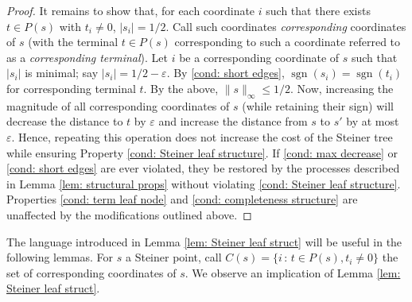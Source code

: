 \documentclass{article}\providecommand{\DeclareRedundantLanguages}[2]{}\usepackage[a4paper,margin=20mm]{geometry}
\DeclareMathOperator{\sgn}{sgn}
\newcommand{\1}{\textbf{1}}
\begin{document}
\begin{proof}
It remains to show that, for each coordinate $i$ such that there exists $t \in P(s)$ with $t_i \neq 0$, $|s_i| = 1/2$. Call such coordinates \textit{corresponding} coordinates of $s$ (with the terminal $t \in P(s)$ corresponding to such a coordinate referred to as a \textit{corresponding terminal}). Let $i$ be a corresponding coordinate of $s$ such that $|s_i|$ is minimal; say $|s_i| = 1/2 - \varepsilon$. By \ref{cond: short edges}, $\sgn(s_i) = \sgn(t_i)$ for corresponding terminal $t.$ By the above, $\|s\|_{\infty} \leq 1/2$. Now, increasing the magnitude of all corresponding coordinates of $s$ (while retaining their sign) will decrease the distance to $t$ by $\varepsilon$ and increase the distance from $s$ to $s'$ by at most $\varepsilon$. Hence, repeating this operation does not increase the cost of the Steiner tree while ensuring Property \ref{cond: Steiner leaf structure}.  If \ref{cond: max decrease} or \ref{cond: short edges} are ever violated, they be restored by the processes described in Lemma \ref{lem: structural props} without violating \ref{cond: Steiner leaf structure}. Properties \ref{cond: term leaf node} and \ref{cond: completeness structure} are unaffected by the modifications outlined above.
\end{proof}

The language introduced in Lemma \ref{lem: Steiner leaf struct} will be useful in the following lemmas. For $s$ a Steiner point, call $C(s) = \{i \,:\, t \in P(s), t_i \neq 0\}$ the set of corresponding coordinates of $s$. We observe an implication of Lemma \ref{lem: Steiner leaf struct}.
\end{document}
